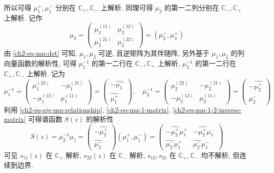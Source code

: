 所以可得 $ \mu_{1}^{+}, \mu_{1}^{-} $ 分别在 $ \mathbb{C}_{+}, \mathbb{C}_{-} $ 上解析. 同理可得 $ \mu_{2} $ 的第一二列分别在 $ \mathbb{C}_{-}, \mathbb{C}_{+} $ 上解析. 记作
\begin{equation*}
    \mu_{2} =
    \begin{pmatrix}
        \mu_{2}^{(11)} & \mu_{2}^{(12)} \\ \mu_{2}^{(21)} & \mu_{2}^{(22)}
    \end{pmatrix} = (\mu_{2}^{-}, \mu_{2}^{+})
\end{equation*}
由 \eqref{ch2-eq-mu-det} 可知, $ \mu_{1}, \mu_{2} $ 可逆, 且逆矩阵为其伴随阵, 另外基于 $ \mu_{1}, \mu_{2} $ 的列向量函数的解析性, 可得 $ \mu_{1}^{-1} $ 的第一二行在 $ \mathbb{C}_{-}, \mathbb{C}_{+} $ 上解析, $ \mu_{2}^{-1} $ 的第一二行在 $ \mathbb{C}_{+}, \mathbb{C}_{-} $ 上解析. 记为
\begin{equation}
    \mu_{1}^{-1} =
    \begin{pmatrix}
        \mu_{1}^{(22)} & - \mu_{1}^{(21)} \\ - \mu_{1}^{(12)} & \mu_{1}^{(11)}
    \end{pmatrix} = \begin{pmatrix}
        - \hat{\mu_{1}^{-}} \\ \hat{\mu_{1}^{+}}
    \end{pmatrix}
    , \quad
    \mu_{2}^{-1} =
    \begin{pmatrix}
        \mu_{2}^{(22)} & - \mu_{2}^{(21)} \\ - \mu_{2}^{(12)} & \mu_{2}^{(11)}
    \end{pmatrix} = \begin{pmatrix}
        - \hat{\mu_{2}^{+}} \\ \hat{\mu_{2}^{-}}
    \end{pmatrix} \label{ch2-eq-mu-1-2-inverse-matrix}
\end{equation}
利用 \eqref{ch2-eq-eig-mu-relationship}, \eqref{ch2-eq-mu-1-matrix}, \eqref{ch2-eq-mu-1-2-inverse-matrix} 可得谱函数 $ S(z) $ 的解析性
\begin{equation}
    S(z) = \mu_{2}^{-1} \mu_{1} = \begin{pmatrix} - \hat{\mu_{2}^{+}} \\ \hat{\mu_{2}^{-}} \end{pmatrix} (\mu_{1}^{+}, \mu_{1}^{-})
    = \begin{pmatrix} - \hat{\mu_{2}^{+}} \mu_{1}^{+} & - \hat{\mu_{2}^{+}} \mu_{1}^{-} \\ \hat{\mu_{2}^{-}} \mu_{1}^{+} & \hat{\mu_{2}^{-}} \mu_{1}^{-} \end{pmatrix}
\end{equation}
可见 $ s_{11}(z) $ 在 $ \mathbb{C}_{+} $ 解析, $ s_{22}(z) $ 在 $ \mathbb{C}_{-} $ 解析, $ s_{12}, s_{21} $ 在 $ \mathbb{C}_{+}, \mathbb{C}_{-} $ 均不解析, 但连续到边界.

